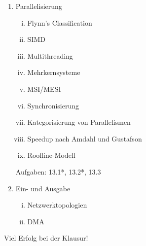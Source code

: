 \documentclass{article}
\begin{document}
\begin{enumerate}
	      Aufgaben: 12.1, 12.2
	\item Parallelisierung
	      \begin{enumerate}[i.]
		      \item Flynn's Classification
		      \item SIMD
		      \item Multithreading
		      \item Mehrkernsysteme
		      \item MSI/MESI
		      \item Synchronisierung
		      \item Kategorisierung von Parallelismen
		      \item Speedup nach Amdahl und Gustafson
		      \item Roofline-Modell
	      \end{enumerate}
	      Aufgaben: 13.1*, 13.2*, 13.3
	\item Ein- und Ausgabe
	      \begin{enumerate}[i.]
		      \item Netzwerktopologien
		      \item DMA
	      \end{enumerate}
\end{enumerate}
\vspace{3cm}
\begin{center}
	\Large Viel Erfolg bei der Klausur!
\end{center}
\end{document}
